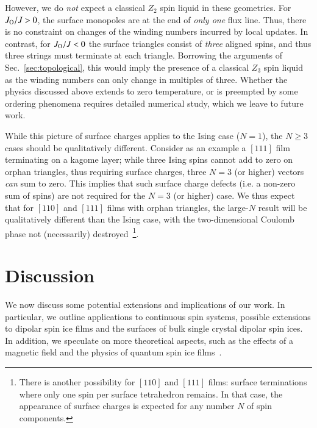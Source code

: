 \documentclass[aps,prx,reprint,runinaddress,superscriptaddress,amsmath,amssymb,floatfix,longbibliography]{revtex4-1}
\newcommand{\Jo}{J_{\rm O}}
\begin{document}
However, we do \emph{not} expect a classical $Z_2$ spin liquid in these geometries. For $\Jo/J > 0$, the surface monopoles are at the end of \emph{only one} flux line. Thus, there is no constraint on changes of the winding numbers incurred by local updates. In contrast, for $\Jo/J < 0$ the surface triangles consist of \emph{three} aligned spins, and thus three strings must terminate at each triangle. Borrowing the arguments of Sec.~\ref{sec:topological}, this would imply the presence of a classical $Z_3$ spin liquid~\cite{Motrunich2003,Rehn2016} as the winding numbers can only change in multiples of three. Whether the physics discussed above extends to zero temperature, or is preempted by some ordering phenomena requires detailed numerical study, which we leave to future work.

While this picture of surface charges applies to the Ising case ($N=1$), the $N \geq 3$ cases should be qualitatively different. Consider as an example a $[111]$ film terminating on a kagome layer; while three Ising spins cannot add to zero on orphan triangles, thus requiring surface charges, three $N=3$ (or higher) vectors \emph{can} sum to zero. This implies that such surface charge defects (i.e. a non-zero sum of spins) are not required for the $N=3$ (or higher) case. We thus expect that for $[110]$ and $[111]$ films with orphan triangles, the large-$N$ result will be qualitatively different than the Ising case, with the two-dimensional Coulomb phase not (necessarily) destroyed~\footnote{There is another possibility for $[110]$ and $[111]$ films: surface terminations where only one spin per surface tetrahedron remains. In that case, the appearance of surface charges is expected for any number $N$ of spin components.}.

\section{Discussion}
\label{sec:discussion}

We now discuss some potential extensions and implications of our work. In particular, we outline applications to continuous spin systems, possible extensions to dipolar spin ice films and the surfaces of bulk single crystal dipolar spin ices. In addition, we speculate on more theoretical aspects, such as the effects of a magnetic field and the physics of quantum spin ice films~\cite{Gingras2014}.
\end{document}
